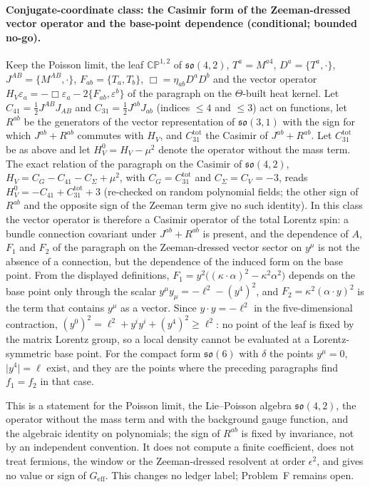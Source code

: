 \paragraph{Conjugate-coordinate class: the Casimir form of the Zeeman-dressed vector operator and the base-point dependence (conditional; bounded no-go).}
Keep the Poisson limit, the leaf \(\mathbb{CP}^{1,2}\) of \(\mathfrak{so}(4,2)\), \(T^a=M^{a4}\), \(D^a=\{T^a,\cdot\}\), \(J^{AB}=\{M^{AB},\cdot\}\), \(F_{ab}=\{T_a,T_b\}\), \(\Box=\eta_{ab}D^aD^b\) and the vector operator \(H_V\varepsilon_a=-\Box\varepsilon_a-2\{F_{ab},\varepsilon^b\}\) of the paragraph on the \(\Theta\)-built heat kernel. Let \(C_{41}=\tfrac12J^{AB}J_{AB}\) and \(C_{31}=\tfrac12J^{ab}J_{ab}\) (indices \(\le4\) and \(\le3\)) act on functions, let \(R^{ab}\) be the generators of the vector representation of \(\mathfrak{so}(3,1)\) with the sign for which \(J^{ab}+R^{ab}\) commutes with \(H_V\), and \(C_{31}^{\mathrm{tot}}\) the Casimir of \(J^{ab}+R^{ab}\). Let \(C_{31}^{\mathrm{tot}}\) be as above and let \(H_V^{0}=H_V-\mu^2\) denote the operator without the mass term. The exact relation of the paragraph on the Casimir of \(\mathfrak{so}(4,2)\), \(H_V=C_G-C_{41}-C_\Sigma+\mu^2\), with \(C_G=C_{31}^{\mathrm{tot}}\) and \(C_\Sigma=C_V=-3\), reads \(H_V^{0}=-C_{41}+C_{31}^{\mathrm{tot}}+3\) (re-checked on random polynomial fields; the other sign of \(R^{ab}\) and the opposite sign of the Zeeman term give no such identity). In this class the vector operator is therefore a Casimir operator of the total Lorentz spin: a bundle connection covariant under \(J^{ab}+R^{ab}\) is present, and the dependence of \(A\), \(F_1\) and \(F_2\) of the paragraph on the Zeeman-dressed vector sector on \(y^\mu\) is not the absence of a connection, but the dependence of the induced form on the base point. From the displayed definitions, \(F_1=y^2\bigl((\kappa\cdot\alpha)^2-\kappa^2\alpha^2\bigr)\) depends on the base point only through the scalar \(y^\mu y_\mu=-\ell^2-(y^4)^2\), and \(F_2=\kappa^2(\alpha\cdot y)^2\) is the term that contains \(y^\mu\) as a vector. Since \(y\cdot y=-\ell^2\) in the five-dimensional contraction, \((y^0)^2=\ell^2+y^iy^i+(y^4)^2\ge\ell^2\): no point of the leaf is fixed by the matrix Lorentz group, so a local density cannot be evaluated at a Lorentz-symmetric base point. For the compact form \(\mathfrak{so}(6)\) with \(\delta\) the points \(y^\mu=0\), \(\lvert y^4\rvert=\ell\) exist, and they are the points where the preceding paragraphs find \(f_1=f_2\) in that case.

This is a statement for the Poisson limit, the Lie--Poisson algebra \(\mathfrak{so}(4,2)\), the operator without the mass term and with the background gauge function, and the algebraic identity on polynomials; the sign of \(R^{ab}\) is fixed by invariance, not by an independent convention. It does not compute a finite coefficient, does not treat fermions, the window or the Zeeman-dressed resolvent at order \(\epsilon^2\), and gives no value or sign of \(G_{\mathrm{eff}}\). This changes no ledger label; Problem~F remains open.

